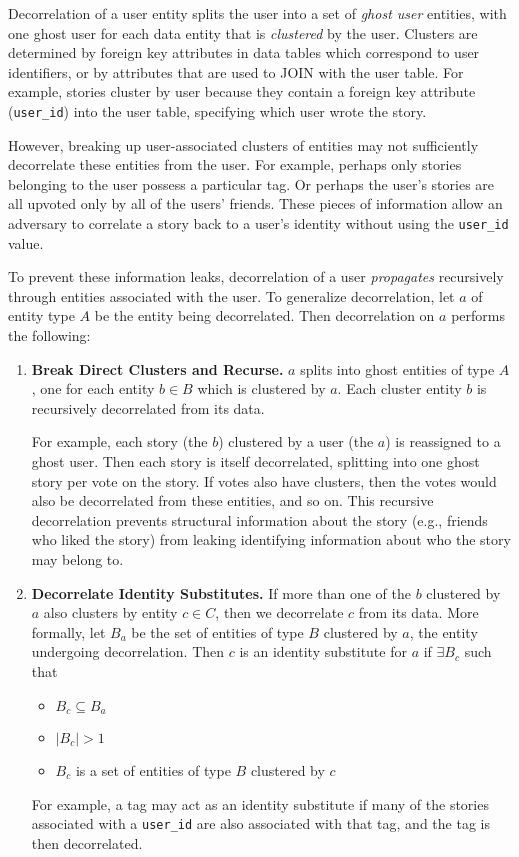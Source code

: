 Decorrelation of a user entity splits the user into a set of \emph{ghost user} entities, with one
ghost user for each data entity that is \emph{clustered} by the user.  Clusters are determined by
foreign key attributes in data tables which correspond to user identifiers, or by attributes that
are used to JOIN with the user table.  For example, stories cluster by user because they contain a
foreign key attribute (\texttt{user\_id}) into the user table, specifying which user wrote the
story.

However, breaking up user-associated clusters of entities may not sufficiently decorrelate these
entities from the user. For example, perhaps only stories belonging to the user possess a particular
tag. Or perhaps the user's stories are all upvoted only by all of the users'
friends. These pieces of information allow an adversary to correlate a story back to a user's
identity without using the \texttt{user\_id} value. 

To prevent these information leaks, decorrelation of a user \emph{propagates} recursively through
entities associated with the user. To generalize decorrelation, let $a$ of entity type $A$ be the
entity being decorrelated. Then decorrelation on $a$ performs the following: 
\begin{enumerate}
    \item \textbf{Break Direct Clusters and Recurse.} $a$ splits into ghost entities of type $A$, one for each entity
        $b\in B$ which is clustered by $a$. Each cluster entity $b$ is recursively
        decorrelated from its data.

        For example, each story (the $b$) clustered by a user (the $a$) is reassigned to a ghost
        user. Then each story is itself decorrelated, splitting into one ghost story per vote on the
        story. If votes also have clusters, then the votes would also be decorrelated from these
        entities, and so on. This recursive decorrelation prevents structural information about the
        story (e.g., friends who liked the story) from leaking identifying information about who the
        story may belong to.

    \item \textbf{Decorrelate Identity Substitutes.} If more than one of the $b$ clustered by $a$ also
        clusters by entity $c \in C$, then we decorrelate $c$ from its data. 
        More formally, let $B_a$ be the set of entities of type $B$ clustered by $a$, the entity undergoing
        decorrelation.  Then $c$ is an identity substitute for $a$ if $\exists B_c$ such that
        \begin{itemize}
            \item $B_c \subseteq B_a$
            \item $|B_c| > 1$ 
            \item $B_c$ is a set of entities of type $B$ clustered by $c$
        \end{itemize}

        For example, a tag may act as an identity substitute if many of the stories associated with
        a \texttt{user\_id} are also associated with that tag, and the tag is then decorrelated.
\end{enumerate}


